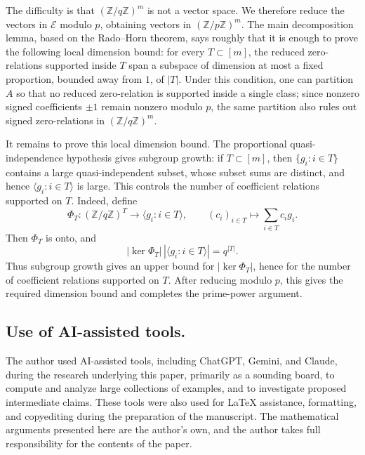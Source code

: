 \documentclass[11pt]{amsart}
\newcommand{\Z}{\mathbb{Z}}
\begin{document}
The difficulty is that \((\Z/q\Z)^m\) is not a vector space. We therefore reduce the vectors in \(\mathcal E\) modulo \(p\), obtaining vectors in \((\Z/p\Z)^m\). The main decomposition lemma, based on the Rado--Horn theorem, says roughly that it is enough to prove the following local dimension bound: for every \(T\subset[m]\), the reduced zero-relations supported inside \(T\) span a subspace of dimension at most a fixed proportion, bounded away from \(1\), of \(|T|\). Under this condition, one can partition \(A\) so that no reduced zero-relation is supported inside a single class; since nonzero signed coefficients \(\pm1\) remain nonzero modulo \(p\), the same partition also rules out signed zero-relations in \((\Z/q\Z)^m\).

It remains to prove this local dimension bound. The proportional quasi-independence hypothesis gives subgroup growth: if \(T\subset[m]\), then \(\{g_i:i\in T\}\) contains a large quasi-independent subset, whose subset sums are distinct, and hence \(\langle g_i:i\in T\rangle\) is large. This controls the number of coefficient relations supported on \(T\). Indeed, define
$$
        \Phi_T:(\Z/q\Z)^T\to \langle g_i:i\in T\rangle,
        \qquad
        (c_i)_{i\in T}\mapsto \sum_{i\in T} c_i g_i.
$$
Then \(\Phi_T\) is onto, and
$$
        |\ker \Phi_T|\,|\langle g_i:i\in T\rangle|=q^{|T|}.
$$
Thus subgroup growth gives an upper bound for \(|\ker\Phi_T|\), hence for the number of coefficient relations supported on \(T\). After reducing modulo \(p\), this gives the required dimension bound and completes the prime-power argument.

\subsection*{Use of AI-assisted tools.}
The author used AI-assisted tools, including ChatGPT, Gemini, and Claude, during the research underlying this paper, primarily as a sounding board, to compute and analyze large collections of examples, and to investigate proposed intermediate claims. These tools were also used for LaTeX assistance, formatting, and copyediting during the preparation of the manuscript. The mathematical arguments presented here are the author's own, and the author takes full responsibility for the contents of the paper.

\end{document}
